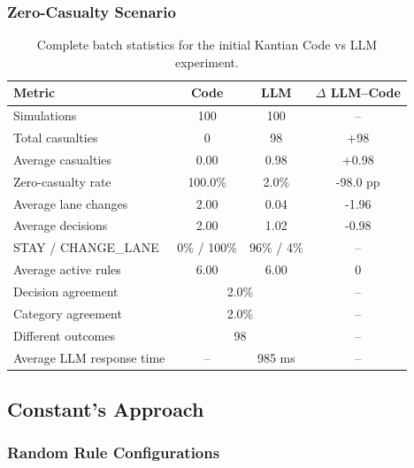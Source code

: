 \documentclass[10pt,a4paper]{article}
\begin{document}
\subsubsection{Zero-Casualty Scenario}

\begin{table}[H]
\centering
\small
\begin{tabular}{lccc}
\toprule
Metric & Code & LLM & $\Delta$ LLM--Code \\
\midrule
Simulations & 100 & 100 & -- \\
Total casualties & 0 & 98 & +98 \\
Average casualties & 0.00 & 0.98 & +0.98 \\
Zero-casualty rate & 100.0\% & 2.0\% & -98.0 pp \\
Average lane changes & 2.00 & 0.04 & -1.96 \\
Average decisions & 2.00 & 1.02 & -0.98 \\
STAY / CHANGE\_LANE & 0\% / 100\% & 96\% / 4\% & -- \\
Average active rules & 6.00 & 6.00 & 0 \\
Decision agreement & \multicolumn{2}{c}{2.0\%} & -- \\
Category agreement & \multicolumn{2}{c}{2.0\%} & -- \\
Different outcomes & \multicolumn{2}{c}{98} & -- \\
Average LLM response time & -- & 985 ms & -- \\
\bottomrule
\end{tabular}
\caption{Complete batch statistics for the initial Kantian Code vs LLM
experiment.}
\label{tab:app-kant-initial}
\end{table}










\subsection{Constant's Approach}

\subsubsection{Random Rule Configurations}
\end{document}
